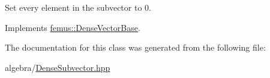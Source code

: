 Set every element in the subvector to 0. 



Implements \mbox{\hyperlink{classfemus_1_1_dense_vector_base_abd1b93469867212f796c7b86d242c550}{femus\+::\+Dense\+Vector\+Base}}.



The documentation for this class was generated from the following file\+:\begin{DoxyCompactItemize}
\item 
algebra/\mbox{\hyperlink{_dense_subvector_8hpp}{Dense\+Subvector.\+hpp}}\end{DoxyCompactItemize}
